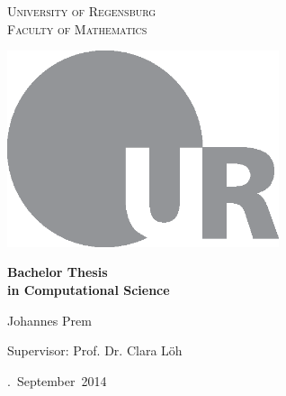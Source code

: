 \begin{titlepage}
    \begin{center}
    \scshape
        University of Regensburg\\
        Faculty of Mathematics
        
    \vspace{2cm}
    
        
    \vspace{2.5cm}
    
        \includegraphics[width=0.6\textwidth]{ur_logo.eps}
        
    \vspace{2cm}
    
        {\Large\bfseries%
            Bachelor Thesis\\
            in Computational Science}
        
    \vspace{1.3cm}
    
        Johannes Prem
        
    \vspace{0.4cm}
    
        Supervisor: Prof. Dr. Clara Löh
        
    \vfill
    
        \number\day.~September~2014
    \end{center}
\end{titlepage}

